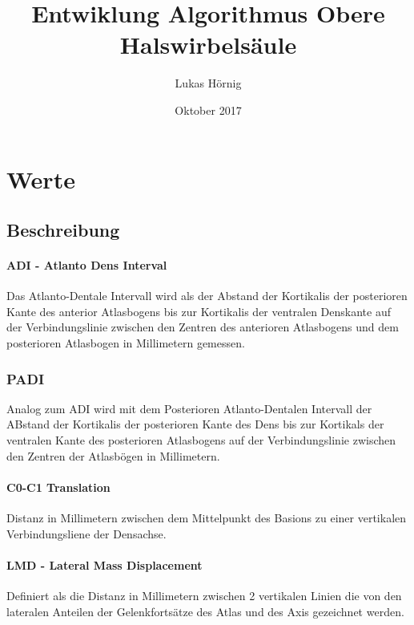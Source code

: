 \documentclass{report}
\title{Entwiklung Algorithmus Obere Halswirbelsäule}
\author{Lukas Hörnig}
\date{Oktober 2017}
\begin{document}
\maketitle


\section{Werte}
\subsection{Beschreibung}
\paragraph{ADI - Atlanto Dens Interval}

Das Atlanto-Dentale Intervall wird als der Abstand der Kortikalis der posterioren Kante des anterior Atlasbogens bis zur Kortikalis der ventralen Denskante auf der Verbindungslinie zwischen den Zentren des anterioren Atlasbogens und dem posterioren Atlasbogen in Millimetern gemessen. 

\subsubsection{PADI}
Analog zum ADI wird mit dem Posterioren Atlanto-Dentalen Intervall der ABstand der Kortikalis der posterioren Kante des Dens bis zur Kortikals der ventralen Kante des posterioren Atlasbogens auf der Verbindungslinie zwischen den Zentren der Atlasbögen in Millimetern. 



\paragraph{C0-C1 Translation} %
\label{par:c0_c1_translation}
Distanz in Millimetern zwischen dem Mittelpunkt des Basions zu einer vertikalen Verbindungsliene der Densachse.



\paragraph{LMD - Lateral Mass Displacement }
Definiert als die Distanz in Millimetern zwischen 2 vertikalen Linien die von den lateralen Anteilen der Gelenkfortsätze des Atlas und des Axis gezeichnet werden.
\end{document}
